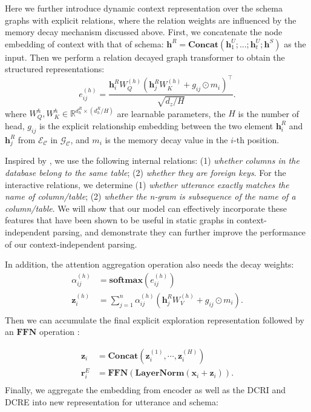 \documentclass[letterpaper]{article} \usepackage{aaai21}  \usepackage{times}  \usepackage{helvet} \usepackage{courier}  \usepackage[hyphens]{url}  \usepackage{graphicx} \urlstyle{rm} \def\UrlFont{\rm}  \usepackage{natbib}  \usepackage{caption} \frenchspacing  \setlength{\pdfpagewidth}{8.5in}  \setlength{\pdfpageheight}{11in}
\begin{document}
Here we further introduce dynamic context representation over the schema graphs with explicit relations, where the relation weights are influenced by the memory decay mechanism discussed above.
First, we concatenate the node embedding of context with that of schema: $\mathbf{h}^{R}= \mathbf{Concat} \left( \mathbf{h}^{U}_{1}; ... ;  \mathbf{h}^{U}_{t};\mathbf{h}^{S}  \right)$ as the input. Then we perform a relation decayed graph transformer to obtain the structured representations:
\begin{equation}
e_{i j}^{(h)}=\frac{\mathbf{h}^{R}_{i} W_{Q}^{(h)}(\mathbf{h}^{R}_{j} {W}_{K}^{(h)} + g_{i j} \odot m_i)^{\top}}{\sqrt{d_{z} / H}}.
\end{equation}
where $W_{Q}^{h}, W_{K}^{h} \in \mathbb{R}^{d_{h}^{R} \times (d_{h}^{R} / H)}$ are learnable parameters, the $H$ is the number of head, $g_{ij}$ is the explicit relationship embedding between the two element $\mathbf{h}^{R}_{i}$ and $\mathbf{h}^{R}_{j}$ from $\mathcal{E}_\mathcal{C}$ in $\mathcal{G}_\mathcal{C}$, and $m_i$ is the memory decay value in the $i$-th position. 

Inspired by \citet{DBLP:conf/acl/WangSLPR20}, we use the following internal relations: (1) \textit{whether columns in the database belong to the same table}; (2) \textit{whether they are foreign keys}.
For the interactive relations, we determine (1) \textit{whether utterance exactly matches the name of column/table}; (2) \textit{whether the n-gram is subsequence of the name of a column/table}. 
We will show that our model can effectively incorporate these features that have been shown to be useful in static graphs in context-independent parsing, and demonstrate they can further improve the performance of our context-independent parsing.


In addition, the attention aggregation operation also needs the decay weights:
\begin{equation}
\begin{aligned}
\alpha_{i j}^{(h)}&=\mathbf{softmax}\left(e_{i j}^{(h)}\right) \\
\mathbf{z}_{i}^{(h)}&=\sum_{j=1}^{n} \alpha_{i j}^{(h)}\left(\mathbf{h}_{j}^{R} W_{V}^{(h)}+g_{i j}  \odot m_i\right). \\
\end{aligned}
\end{equation}
Then we can accumulate the final explicit exploration representation  followed by an $\mathbf{FFN}$ operation \cite{DBLP:conf/nips/VaswaniSPUJGKP17}:

\begin{equation}
\begin{aligned}
\mathbf{z}_{i}&=\mathbf{Concat}\left(\mathbf{z}_{i}^{(1)}, \cdots, \mathbf{z}_{i}^{(H)}\right) \\
{\mathbf{r}}_{i}^{E}&=\mathbf{FFN}(\mathbf{LayerNorm}\left(\boldsymbol{x}_{i}+\boldsymbol{z}_{i}\right)). \\
\end{aligned}
\end{equation}
Finally, we aggregate the embedding from encoder as well as the DCRI and DCRE into new representation for utterance and schema:
\end{document}
